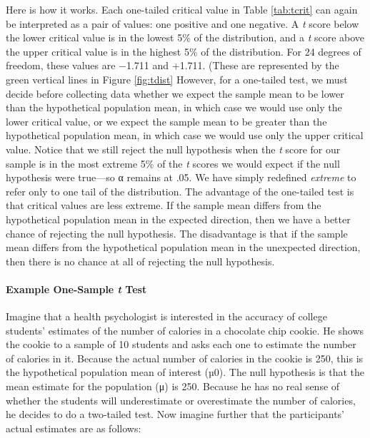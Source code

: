 \documentclass[
]{krantz}
\begin{document}
Here is how it works. Each one-tailed critical value in Table \ref{tab:tcrit} can again be interpreted as a pair of values: one positive and one negative. A \emph{t} score below the lower critical value is in the lowest 5\% of the distribution, and a \emph{t} score above the upper critical value is in the highest 5\% of the distribution. For 24 degrees of freedom, these values are −1.711 and +1.711. (These are represented by the green vertical lines in Figure \ref{fig:tdist} However, for a one-tailed test, we must decide before collecting data whether we expect the sample mean to be lower than the hypothetical population mean, in which case we would use only the lower critical value, or we expect the sample mean to be greater than the hypothetical population mean, in which case we would use only the upper critical value. Notice that we still reject the null hypothesis when the \emph{t} score for our sample is in the most extreme 5\% of the \emph{t} scores we would expect if the null hypothesis were true---so α remains at .05. We have simply redefined \emph{extreme} to refer only to one tail of the distribution. The advantage of the one-tailed test is that critical values are less extreme. If the sample mean differs from the hypothetical population mean in the expected direction, then we have a better chance of rejecting the null hypothesis. The disadvantage is that if the sample mean differs from the hypothetical population mean in the unexpected direction, then there is no chance at all of rejecting the null hypothesis.

\hypertarget{example-one-sample-t-test}{%
\paragraph*{\texorpdfstring{Example One-Sample \emph{t} Test}{Example One-Sample t Test}}\label{example-one-sample-t-test}}

Imagine that a health psychologist is interested in the accuracy of college students' estimates of the number of calories in a chocolate chip cookie. He shows the cookie to a sample of 10 students and asks each one to estimate the number of calories in it. Because the actual number of calories in the cookie is 250, this is the hypothetical population mean of interest (µ0). The null hypothesis is that the mean estimate for the population (μ) is 250. Because he has no real sense of whether the students will underestimate or overestimate the number of calories, he decides to do a two-tailed test. Now imagine further that the participants' actual estimates are as follows:
\end{document}
